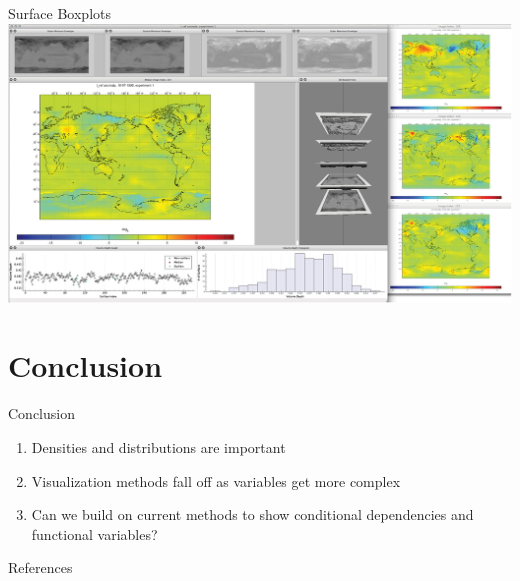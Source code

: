 \documentclass[xcolor={dvipsnames}]{beamer}
\begin{document}
\begin{frame}{Surface Boxplots\cite{genton_surface_2014}}
\includegraphics[width=\textwidth]{figs/surfacebox.png}
\end{frame}

\section{Conclusion}
\begin{frame}{Conclusion}
\begin{enumerate}
    \item Densities and distributions are important
    \item Visualization methods fall off as variables get more complex
    \item Can we build on current methods to show conditional dependencies and functional variables? 
\end{enumerate}
\end{frame}

\begin{frame}[allowframebreaks]{References}
\printbibliography
\end{frame}
\end{document}
